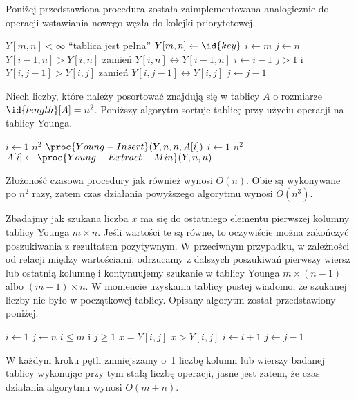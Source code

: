 \subproblem %

\subproblem %
Poniżej przedstawiona procedura została zaimplementowana analogicznie do operacji wstawiania nowego węzła do kolejki priorytetowej.
\begin{codebox}
\li	\If $Y[m,n]<\infty$
\li		\Then \Error ``tablica jest pełna''
		\End
\li	$Y[m,n]\gets\id{key}$
\li	$i\gets m$
\li	$j\gets n$
\li	\While $Y[i-1,n]>Y[i,n]$
\li		\Do
			zamień $Y[i,n]\leftrightarrow Y[i-1,n]$
\li			$i\gets i-1$
		\End
\li	\While $j>1$ i $Y[i,j-1]>Y[i,j]$
\li		\Do
			zamień $Y[i,j-1]\leftrightarrow Y[i,j]$
\li			$j\gets j-1$
		\End
\end{codebox}

\subproblem %
Niech liczby, które należy posortować znajdują się w tablicy $A$ o rozmiarze $\id{length}[A]=n^2$. Poniższy algorytm sortuje tablicę przy użyciu operacji na tablicy Younga.
\begin{codebox}
\li	\For $i\gets1$ \To $n^2$
\li		\Do $\proc{Young-Insert}(Y,n,n,A[i])$
		\End
\li	\For $i\gets1$ \To $n^2$
\li		\Do $A[i]\gets\proc{Young-Extract-Min}(Y,n,n)$
		\End
\end{codebox}
Złożoność czasowa procedury  jak również  wynosi $O(n)$. Obie są wykonywane po $n^2$ razy, zatem czas działania powyższego algorytmu wynosi $O(n^3)$.

\subproblem %
Zbadajmy jak szukana liczba $x$ ma się do ostatniego elementu pierwszej kolumny tablicy Younga $m\times n$. Jeśli wartości te są równe, to oczywiście można zakończyć poszukiwania z rezultatem pozytywnym. W przeciwnym przypadku, w zależności od relacji między wartościami, odrzucamy z dalszych poszukiwań pierwszy wiersz lub ostatnią kolumnę i kontynuujemy szukanie w tablicy Younga $m\times(n-1)$ albo $(m-1)\times n$. W momencie uzyskania tablicy pustej wiadomo, że szukanej liczby nie było w początkowej tablicy. Opisany algorytm został przedstawiony poniżej.
\begin{codebox}
\li	$i\gets1$
\li	$j\gets n$
\li	\While $i\le m$ i $j\ge1$
\li		\Do
			\If $x=Y[i,j]$
\li				\Then \Return {}
\li			\ElseIf $x>Y[i,j]$
\li				\Then $i\gets i+1$
\li			\ElseNoIf $j\gets j-1$
				\End
		\End
\li	\Return {}
\end{codebox}
W każdym kroku pętli  zmniejszamy o~1 liczbę kolumn lub wierszy badanej tablicy wykonując przy tym stałą liczbę operacji, jasne jest zatem, że czas działania algorytmu wynosi $O(m+n)$.

\endinput
